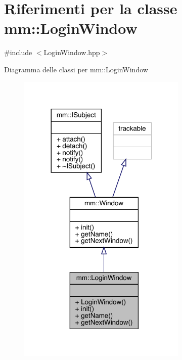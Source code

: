 \hypertarget{classmm_1_1_login_window}{}\section{Riferimenti per la classe mm\+:\+:Login\+Window}
\label{classmm_1_1_login_window}


{\ttfamily \#include $<$Login\+Window.\+hpp$>$}



Diagramma delle classi per mm\+:\+:Login\+Window\nopagebreak
\begin{figure}[H]
\begin{center}
\leavevmode
\includegraphics[width=228pt]{da/db3/classmm_1_1_login_window__inherit__graph}
\end{center}
\end{figure}


